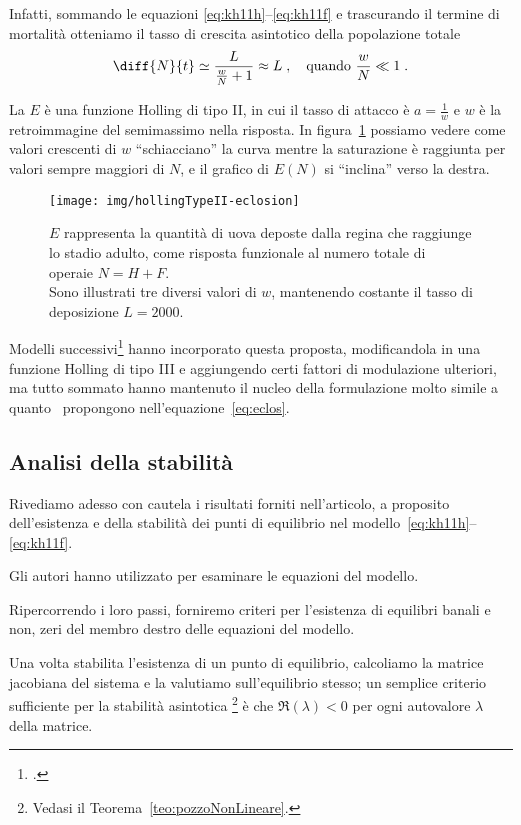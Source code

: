 Infatti, sommando le equazioni \eqref{eq:kh11h}--\eqref{eq:kh11f} e trascurando il termine di mortalità otteniamo
il tasso di crescita asintotico della popolazione totale
$$\diff{N}{t} \simeq \frac{L}{ \frac{w}{N} + 1} \approx L \; , \quad \text{quando } \frac{w}{N} \ll 1 \; .$$

La $E$ è una funzione Holling di tipo II, in cui il tasso di attacco è $a=\frac{1}{w}$ e $w$
è la retroimmagine del semimassimo nella risposta. In figura~\ref{img:eclos} possiamo vedere come valori
crescenti di $w$ ``schiacciano'' la curva mentre la saturazione è raggiunta per valori sempre maggiori di $N$,
e il grafico di $E(N)$ si ``inclina'' verso la destra.

\begin{figure}[pbh]
    \centering
    \texttt{[image: img/hollingTypeII-eclosion]}

    \caption[Schiusa, Holling tipo II]{$E$ rappresenta la quantità di uova deposte dalla regina che raggiunge lo
    stadio adulto, come risposta funzionale al numero totale di operaie $N=H+F$.
    \\
    Sono illustrati tre diversi valori di $w$, mantenendo costante il tasso di deposizione $L=2000$.}
    \label{img:eclos}
\end{figure}

Modelli successivi\footcite{ratti2017} hanno incorporato questa proposta, modificandola in una funzione Holling
di tipo III e aggiungendo certi fattori di modulazione ulteriori, ma tutto sommato hanno mantenuto il nucleo
della formulazione molto simile a quanto~\citeauthor{khoury2011} propongono nell'equazione~\eqref{eq:eclos}.


\subsection{Analisi della stabilità}
Rivediamo adesso con cautela i risultati forniti nell'articolo, a proposito dell'esistenza e della stabilità
dei punti di equilibrio nel modello~\eqref{eq:kh11h}--\eqref{eq:kh11f}.

Gli autori hanno utilizzato  per esaminare le equazioni del modello.

Ripercorrendo i loro passi, forniremo criteri per l'esistenza di equilibri banali e non, \ie zeri del membro
destro delle equazioni del modello.

Una volta stabilita l'esistenza di un punto di equilibrio, calcoliamo la matrice jacobiana del sistema e
la valutiamo sull'equilibrio stesso; un semplice criterio sufficiente per la stabilità asintotica
\footnote{Vedasi il Teorema~\ref{teo:pozzoNonLineare}.}
è che $\Re (\lambda) < 0$ per ogni autovalore $\lambda$ della matrice.


